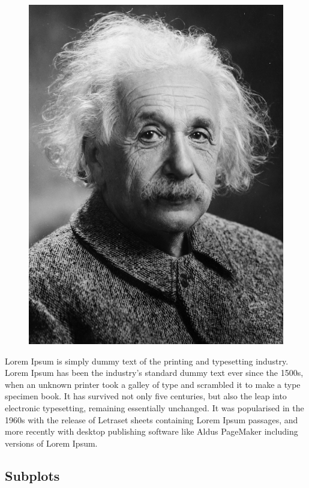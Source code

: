 \documentclass[twocolumn]{article}
\begin{document}
\begin{figure}
    \centering
    \includegraphics[width=0.25\columnwidth]{Images/Albert_Einstein.png}
\end{figure}
Lorem Ipsum is simply dummy text of the printing and typesetting industry. Lorem Ipsum has been the industry's standard dummy text ever since the 1500s, when an unknown printer took a galley of type and scrambled it to make a type specimen book. It has survived not only five centuries, but also the leap into electronic typesetting, remaining essentially unchanged. It was popularised in the 1960s with the release of Letraset sheets containing Lorem Ipsum passages, and more recently with desktop publishing software like Aldus PageMaker including versions of Lorem Ipsum.

\pagebreak


\subsection{Subplots}
\end{document}
